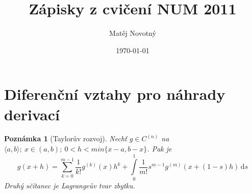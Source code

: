%
%
%

\usepackage[utf8]{inputenc}
\usepackage[czech]{babel}

\usepackage{ifthen}



\newcommand{\kindle}[2]{\ifthenelse{\boolean{kindle}}{#1}{#2}}

\kindle{\usepackage[top = 1.5cm, bottom=2cm, left=0.8cm, right=0.8cm, a5paper]{geometry}}
{
\usepackage[a4paper]{geometry}
\usepackage{fullpage}
}

\usepackage[pdftex]{graphicx}
\usepackage{ifpdf}
\usepackage[pdftex]{hyperref}

\usepackage{amsmath}
\usepackage{amssymb}
\usepackage{amsthm}
\usepackage{latexsym}

\newtheorem{definition}{Definice}
\newtheorem{theorem}{Věta}
\newtheorem{lemma}{Lemma}
\newtheorem{example}{Příklad}
\newtheorem{note}{Poznámka}

\newcommand{\inte}[2]{\int\limits_0^1 #1\,\mathrm{d}#2}
\newcommand{\R}{\mathbb{R}}

\title{Zápisky z cvičení NUM 2011}
\author{Matěj Novotný}
\date{\today}



	
	\maketitle
	\section{Diferenční vztahy pro náhrady derivací}
	
	\kindle{
		\thispagestyle{empty}
		\pagestyle{empty}
	}{}
	
	\begin{note}[Taylorův rozvoj]
		Nechť $g \in C^{(n)}$ na $\langle a,b \rangle;\ x\in (a,b);\ 0<h<min\{x-a,b-x\}$. Pak je
		\begin{equation} \label{diference}
			g(x+h)=\sum_{k=0}^{m-1} \frac{1}{k!} g^{(k)}(x) h^k +
			\inte{\frac{1}{m!} s^{m-1} g^{(m)} (x+(1-s)h)}{s}
		\end{equation}
		Druhý sčítanec je Lagrangeův tvar zbytku.
	\end{note}
	
